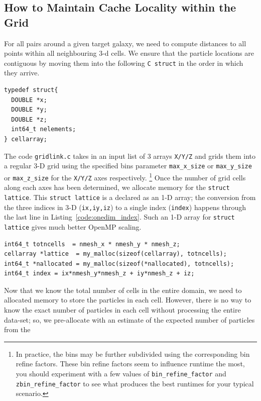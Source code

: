 \documentclass[12pt,titlepage]{article}
\begin{document}
\subsection{How to Maintain Cache Locality within the Grid}
For all pairs around a given target galaxy, we need to compute distances to all points within all neighbouring 3-d cells.
We ensure that the particle locations are contiguous by moving them into the following \texttt{C struct} in the order in which they arrive.
\begin{lstlisting}[label={code:celldefn},caption={Definition of the cellarray structure. This 
structure contains the \texttt{X/Y/Z} positions of all the particles that are in one 3-D cell. }]
typedef struct{
  DOUBLE *x;
  DOUBLE *y;
  DOUBLE *z;
  int64_t nelements;
} cellarray;
\end{lstlisting}
The code \texttt{gridlink.c} takes in an input list of 3 arrays \texttt{X/Y/Z} and grids them into a regular 3-D grid using the specified bins parameter
\texttt{max\_x\_size} or \texttt{max\_y\_size} or \texttt{max\_z\_size} for the \texttt{X/Y/Z} axes respectively. \footnote{In practice, the bins may be further 
subdivided using the corresponding bin refine factors. These bin refine factors seem to influence runtime the most, you should experiment with a few values of 
\texttt{bin\_refine\_factor} and \texttt{zbin\_refine\_factor} to see what produces the best runtimes for your typical scenario.}
Once the number of grid cells along each axes has been determined, we allocate memory for the \texttt{struct lattice}. This \texttt{struct lattice} is a 
declared as an 1-D array; the conversion from the three indices in 3-D (\texttt{ix,iy,iz}) to a single index (\texttt{index}) happens through the last 
line in Listing~\ref{code:onedim_index}. Such an 1-D array for \texttt{struct lattice} gives much better OpenMP scaling.   
\begin{lstlisting}[label={code:onedim_index},caption={Accessing as \texttt{lattice[index]} rather than \texttt{lattice[ix][iy][iz]}.}]
int64_t totncells  = nmesh_x * nmesh_y * nmesh_z;
cellarray *lattice  = my_malloc(sizeof(cellarray), totncells);
int64_t *nallocated = my_malloc(sizeof(*nallocated), totncells);
int64_t index = ix*nmesh_y*nmesh_z + iy*nmesh_z + iz;
\end{lstlisting}
Now that we know the total number of cells in the entire domain, we need to allocated memory to store the particles in each cell. However, there is no way to 
know the exact number of particles in each cell without processing the entire data-set; so, we pre-allocate with an estimate of the expected number of particles from the 
\end{document}
